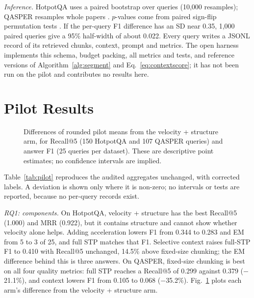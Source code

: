 \documentclass[conference,a4paper]{IEEEtran}
\begin{document}
\textit{Inference.} HotpotQA uses a paired bootstrap over queries (10,000 resamples); QASPER resamples whole papers \cite{field2007bootstrapping}. $p$-values come from paired sign-flip permutation tests \cite{dror2018hitchhiker}. If the per-query F1 difference has an SD near 0.35, 1,000 paired queries give a 95\% half-width of about 0.022. Every query writes a JSONL record of its retrieved chunks, context, prompt and metrics. The open harness implements this schema, budget packing, all metrics and tests, and reference versions of Algorithm~\ref{alg:segment} and Eq.~\eqref{eq:contextscore}; it has not been run on the pilot and contributes no results here.

\section{Pilot Results}
\label{sec:results}

\begin{figure}[t]
\centering

\caption{Differences of rounded pilot means from the velocity + structure arm, for Recall@5 (150 HotpotQA and 107 QASPER queries) and answer F1 (25 queries per dataset). These are descriptive point estimates; no confidence intervals are implied.}
\label{fig:deltas}
\end{figure}

Table~\ref{tab:pilot} reproduces the audited aggregates unchanged, with corrected labels. A deviation is shown only where it is non-zero; no intervals or tests are reported, because no per-query records exist.

\begin{table}[t]
\caption{Pilot aggregates. EM gives exact answers out of 25 in parentheses; bold marks the best quality value per dataset. $^\dagger$Legacy \texttt{velocity\_only}, structural weight active. $^\ddagger$Legacy \texttt{velocity\_acceleration}, structural weight and sign unverified.}
\label{tab:pilot}
\centering\footnotesize
\setlength{\tabcolsep}{2pt}

\end{table}

\textit{RQ1: components.} On HotpotQA, velocity + structure has the best Recall@5 (1.000) and MRR (0.922), but it contains structure and cannot show whether velocity alone helps. Adding acceleration lowers F1 from 0.344 to 0.283 and EM from 5 to 3 of 25, and full STP matches that F1. Selective context raises full-STP F1 to 0.410 with Recall@5 unchanged, 14.5\% above fixed-size chunking; the EM difference behind this is three answers. On QASPER, fixed-size chunking is best on all four quality metrics: full STP reaches a Recall@5 of 0.299 against 0.379 ($-$21.1\%), and context lowers F1 from 0.105 to 0.068 ($-$35.2\%). Fig.~\ref{fig:deltas} plots each arm's difference from the velocity + structure arm.
\end{document}
